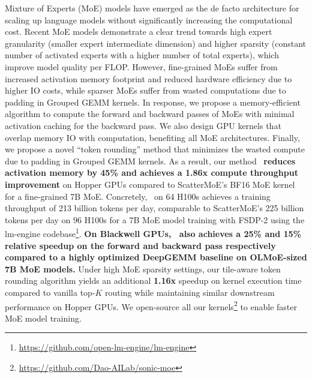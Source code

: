 
Mixture of Experts (MoE) models have emerged as the de facto architecture for scaling up language models without significantly increasing the computational cost. Recent MoE models demonstrate a clear trend towards high expert granularity (smaller expert intermediate dimension) and higher sparsity (constant number of activated experts with a higher number of total experts), which improve model quality per FLOP. However, fine-grained MoEs suffer from increased activation memory footprint and reduced hardware efficiency due to higher IO costs, while sparser MoEs suffer from wasted computations due to padding in Grouped GEMM kernels. In response, we propose a memory-efficient algorithm to compute the forward and backward passes of MoEs with minimal activation caching for the backward pass. We also design GPU kernels that overlap memory IO with computation, benefiting all MoE architectures. Finally, we propose a novel ``token rounding'' method that minimizes the wasted compute due to padding in Grouped GEMM kernels. As a result, our method \Algname\ \textbf{reduces activation memory by 45\% and achieves a 1.86x compute throughput improvement} on Hopper GPUs compared to ScatterMoE's BF16 MoE kernel for a fine-grained 7B MoE. Concretely, \Algname\ on 64 H100s achieves a training throughput of 213 billion tokens per day, comparable to ScatterMoE's 225 billion tokens per day on 96 H100s for a 7B MoE model training with FSDP-2 using the lm-engine codebase\footnote{\small \url{https://github.com/open-lm-engine/lm-engine}}. \textbf{On Blackwell GPUs, \Algname~also achieves a 25\% and 15\% relative speedup on the forward and backward pass respectively compared to a highly optimized DeepGEMM baseline on OLMoE-sized 7B MoE models.} Under high MoE sparsity settings, our tile-aware token rounding algorithm yields an additional \textbf{1.16x} speedup on kernel execution time compared to vanilla top-$K$ routing while maintaining similar downstream performance on Hopper GPUs. We open-source all our kernels\footnote{\small \url{https://github.com/Dao-AILab/sonic-moe}} to enable faster MoE model training.

